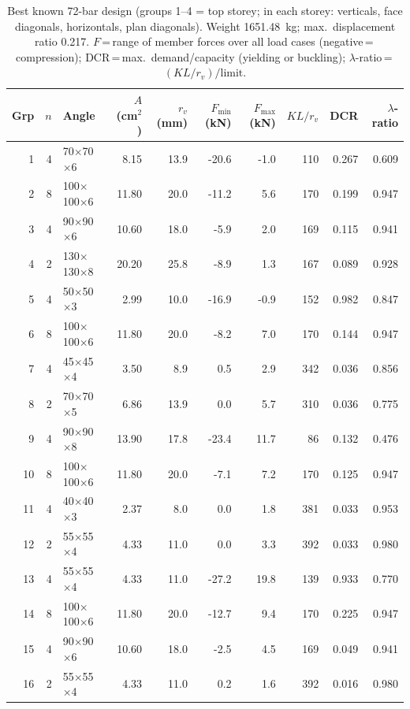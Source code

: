 \begin{table}[tbp]
\centering\footnotesize\setlength{\tabcolsep}{3pt}
\caption{Best known 72-bar design (groups 1--4 = top storey; in each storey: verticals, face diagonals, horizontals, plan diagonals). Weight 1651.48~kg; max.\ displacement ratio 0.217.
$F$\,=\,range of member forces over all load cases (negative\,=\,compression);
DCR\,=\,max.\ demand/capacity (yielding or buckling); $\lambda$-ratio\,=\,$(KL/r_v)/\text{limit}$.}
\label{tab:design72bar}
\begin{tabular}{@{}rrlrrrrrrr@{}}
\toprule
Grp & $n$ & Angle & $A$ (cm$^2$) & $r_v$ (mm) & $F_{\min}$ (kN) & $F_{\max}$ (kN) & $KL/r_v$ & DCR & $\lambda$-ratio\\
\midrule
1 & 4 & 70$\times$70$\times$6 & 8.15 & 13.9 & -20.6 & -1.0 & 110 & 0.267 & 0.609\\
2 & 8 & 100$\times$100$\times$6 & 11.80 & 20.0 & -11.2 & 5.6 & 170 & 0.199 & 0.947\\
3 & 4 & 90$\times$90$\times$6 & 10.60 & 18.0 & -5.9 & 2.0 & 169 & 0.115 & 0.941\\
4 & 2 & 130$\times$130$\times$8 & 20.20 & 25.8 & -8.9 & 1.3 & 167 & 0.089 & 0.928\\
5 & 4 & 50$\times$50$\times$3 & 2.99 & 10.0 & -16.9 & -0.9 & 152 & 0.982 & 0.847\\
6 & 8 & 100$\times$100$\times$6 & 11.80 & 20.0 & -8.2 & 7.0 & 170 & 0.144 & 0.947\\
7 & 4 & 45$\times$45$\times$4 & 3.50 & 8.9 & 0.5 & 2.9 & 342 & 0.036 & 0.856\\
8 & 2 & 70$\times$70$\times$5 & 6.86 & 13.9 & 0.0 & 5.7 & 310 & 0.036 & 0.775\\
9 & 4 & 90$\times$90$\times$8 & 13.90 & 17.8 & -23.4 & 11.7 & 86 & 0.132 & 0.476\\
10 & 8 & 100$\times$100$\times$6 & 11.80 & 20.0 & -7.1 & 7.2 & 170 & 0.125 & 0.947\\
11 & 4 & 40$\times$40$\times$3 & 2.37 & 8.0 & 0.0 & 1.8 & 381 & 0.033 & 0.953\\
12 & 2 & 55$\times$55$\times$4 & 4.33 & 11.0 & 0.0 & 3.3 & 392 & 0.033 & 0.980\\
13 & 4 & 55$\times$55$\times$4 & 4.33 & 11.0 & -27.2 & 19.8 & 139 & 0.933 & 0.770\\
14 & 8 & 100$\times$100$\times$6 & 11.80 & 20.0 & -12.7 & 9.4 & 170 & 0.225 & 0.947\\
15 & 4 & 90$\times$90$\times$6 & 10.60 & 18.0 & -2.5 & 4.5 & 169 & 0.049 & 0.941\\
16 & 2 & 55$\times$55$\times$4 & 4.33 & 11.0 & 0.2 & 1.6 & 392 & 0.016 & 0.980\\
\bottomrule
\end{tabular}
\end{table}
